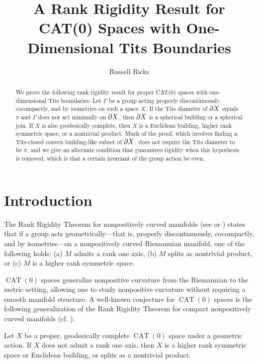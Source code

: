 \documentclass{amsart}
\title[A Rank Rigidity Result for One-Dimensional Tits Boundaries]{A Rank Rigidity Result for CAT(0) Spaces with One-Dimensional Tits Boundaries}
\author{Russell Ricks}
\DeclareMathOperator{\CAT}{CAT}
\begin{document}
\begin{abstract}
We prove the following rank rigidity result for proper CAT(0) spaces with one-dimensional Tits boundaries:
Let $\Gamma$ be a group acting properly discontinuously, cocompactly, and by isometries on such a space $X$.
If the Tits diameter of $\partial X$ equals $\pi$ and $\Gamma$ does not act minimally on $\partial X$, then $\partial X$ is a spherical building or a spherical join.
If $X$ is also geodesically complete, then $X$ is a Euclidean building, higher rank symmetric space, or a nontrivial product.
Much of the proof, which involves finding a Tits-closed convex building-like subset of $\partial X$, does not require the Tits diameter to be $\pi$, and we give an alternate condition that guarantees rigidity when this hypothesis is removed, which is that a certain invariant of the group action be even.
\end{abstract}

\maketitle


\section{Introduction}



The Rank Rigidity Theorem for nonpositively curved manifolds (see \cite{ballmann} or \cite{burns-spatzier}) states that if a group acts geometrically---that is, properly discontinuously, cocompactly, and by isometries---on a nonpositively curved Riemannian manifold, one of the following holds:
(a)  $M$ admits a rank one axis,
(b)  $M$ splits as nontrivial product, or
(c)  $M$ is a higher rank symmetric space.

$\CAT(0)$ spaces generalize nonpositive curvature from the Riemannian to the metric setting, allowing one to study nonpositive curvature without requiring a smooth manifold structure.
A well-known conjecture for $\CAT(0)$ spaces is the following generalization of the Rank Rigidity Theorem for compact nonpositively curved manifolds (cf. \cite{bb}).

\begin{conjecture*} 
Let $X$ be a proper, geodesically complete $\CAT(0)$ space under a geometric action.
If $X$ does not admit a rank one axis, then $X$ is a higher rank
symmetric space or Euclidean building, or splits as a nontrivial product.
\end{conjecture*}
\end{document}
